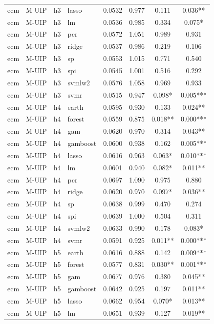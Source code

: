 \begin{ThreePartTable}
\begin{longtable}[t]{llclcccc}
ecm & M-UIP & h3 & lasso & 0.0532 & 0.977 & 0.111 & 0.036**\\
ecm & M-UIP & h3 & lm & 0.0536 & 0.985 & 0.334 & 0.075*\\
ecm & M-UIP & h3 & pcr & 0.0572 & 1.051 & 0.989 & 0.931\\
ecm & M-UIP & h3 & ridge & 0.0537 & 0.986 & 0.219 & 0.106\\
ecm & M-UIP & h3 & sp & 0.0553 & 1.015 & 0.771 & 0.540\\
ecm & M-UIP & h3 & spi & 0.0545 & 1.001 & 0.516 & 0.292\\
ecm & M-UIP & h3 & svmlw2 & 0.0576 & 1.058 & 0.969 & 0.933\\
ecm & M-UIP & h3 & svmr & 0.0515 & 0.947 & 0.098* & 0.005***\\
\addlinespace
ecm & M-UIP & h4 & earth & 0.0595 & 0.930 & 0.133 & 0.024**\\
ecm & M-UIP & h4 & forest & 0.0559 & 0.875 & 0.018** & 0.000***\\
ecm & M-UIP & h4 & gam & 0.0620 & 0.970 & 0.314 & 0.043**\\
ecm & M-UIP & h4 & gamboost & 0.0600 & 0.938 & 0.162 & 0.005***\\
ecm & M-UIP & h4 & lasso & 0.0616 & 0.963 & 0.063* & 0.010***\\
ecm & M-UIP & h4 & lm & 0.0601 & 0.940 & 0.082* & 0.011**\\
ecm & M-UIP & h4 & pcr & 0.0697 & 1.090 & 0.975 & 0.880\\
ecm & M-UIP & h4 & ridge & 0.0620 & 0.970 & 0.097* & 0.036**\\
ecm & M-UIP & h4 & sp & 0.0638 & 0.999 & 0.470 & 0.274\\
ecm & M-UIP & h4 & spi & 0.0639 & 1.000 & 0.504 & 0.311\\
ecm & M-UIP & h4 & svmlw2 & 0.0633 & 0.990 & 0.178 & 0.083*\\
ecm & M-UIP & h4 & svmr & 0.0591 & 0.925 & 0.011** & 0.000***\\
\addlinespace
ecm & M-UIP & h5 & earth & 0.0616 & 0.888 & 0.142 & 0.009***\\
ecm & M-UIP & h5 & forest & 0.0577 & 0.831 & 0.030** & 0.001***\\
ecm & M-UIP & h5 & gam & 0.0677 & 0.976 & 0.380 & 0.045**\\
ecm & M-UIP & h5 & gamboost & 0.0642 & 0.925 & 0.197 & 0.011**\\
ecm & M-UIP & h5 & lasso & 0.0662 & 0.954 & 0.070* & 0.013**\\
ecm & M-UIP & h5 & lm & 0.0651 & 0.939 & 0.127 & 0.019**\\

\end{longtable}
\end{ThreePartTable}
